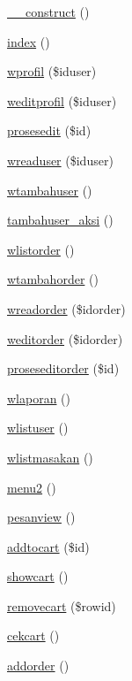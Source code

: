 \begin{DoxyCompactItemize}
\item 
\mbox{\hyperlink{class_waiter_a095c5d389db211932136b53f25f39685}{\+\_\+\+\_\+construct}} ()
\item 
\mbox{\hyperlink{class_waiter_a149eb92716c1084a935e04a8d95f7347}{index}} ()
\item 
\mbox{\hyperlink{class_waiter_ad785691c3d8df8e07e3b5c05e1fbb2ec}{wprofil}} (\$iduser)
\item 
\mbox{\hyperlink{class_waiter_a403ae80285a597d7e1e2a536d537b43d}{weditprofil}} (\$iduser)
\item 
\mbox{\hyperlink{class_waiter_a580c41d234a611e73e56a65f5c5f3e48}{prosesedit}} (\$id)
\item 
\mbox{\hyperlink{class_waiter_aa6f31a11f7d67fc778fb8405922357c3}{wreaduser}} (\$iduser)
\item 
\mbox{\hyperlink{class_waiter_aba71b06fc60f6413543e3f0943288738}{wtambahuser}} ()
\item 
\mbox{\hyperlink{class_waiter_aa1562702e41236c7d697146b2d3023aa}{tambahuser\+\_\+aksi}} ()
\item 
\mbox{\hyperlink{class_waiter_aec7c46990a078c2a25e5b3ba120d41c1}{wlistorder}} ()
\item 
\mbox{\hyperlink{class_waiter_a26af24f9db480fe2cf3ba8d7033890e0}{wtambahorder}} ()
\item 
\mbox{\hyperlink{class_waiter_a485d8eef6a95cc2d0f48450fe27ec8f9}{wreadorder}} (\$idorder)
\item 
\mbox{\hyperlink{class_waiter_ae61f72c824f2e32119bc490231d75343}{weditorder}} (\$idorder)
\item 
\mbox{\hyperlink{class_waiter_ac9ff26ebab745a6235e839fb72bb7ce1}{proseseditorder}} (\$id)
\item 
\mbox{\hyperlink{class_waiter_a198162d05e9335c26be4f79d1f1c1ea5}{wlaporan}} ()
\item 
\mbox{\hyperlink{class_waiter_a518c0e69e15f8e08ddff08921a621ed5}{wlistuser}} ()
\item 
\mbox{\hyperlink{class_waiter_aea86900f769335b2adb355aad479c428}{wlistmasakan}} ()
\item 
\mbox{\hyperlink{class_waiter_ad2c26cff98a5f9db6b4dec1edc8ada7b}{menu2}} ()
\item 
\mbox{\hyperlink{class_waiter_a2184e0cd904ece2a3390ff342aedfeef}{pesanview}} ()
\item 
\mbox{\hyperlink{class_waiter_ae739aac7ade34944585151952e9c523a}{addtocart}} (\$id)
\item 
\mbox{\hyperlink{class_waiter_a31e5e82d730a882fc93614c8e0878d2b}{showcart}} ()
\item 
\mbox{\hyperlink{class_waiter_a1b9dd472c16e5d04be01be8032bd7ffa}{removecart}} (\$rowid)
\item 
\mbox{\hyperlink{class_waiter_a4fe1079bf267b3b43db2d67e1c437e25}{cekcart}} ()
\item 
\mbox{\hyperlink{class_waiter_a375fb206d13bec0bc37f55b825bcbebf}{addorder}} ()
\end{DoxyCompactItemize}
